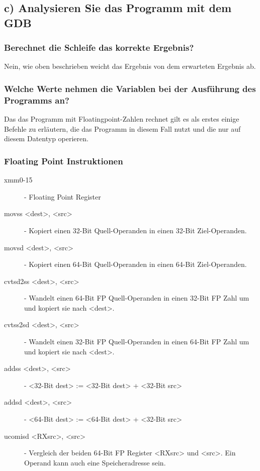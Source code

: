 \documentclass[12pt]{article}
\begin{document}
\subsection{c) Analysieren Sie das Programm mit dem GDB }

\subsubsection{Berechnet die Schleife das korrekte Ergebnis?}
Nein, wie oben beschrieben weicht das Ergebnis von dem erwarteten Ergebnis ab.

\subsubsection{Welche Werte nehmen die Variablen bei der Ausführung des Programms an?}
Das das Programm mit Floatingpoint-Zahlen rechnet gilt es als erstes einige Befehle zu erläutern, die das Programm in diesem Fall nutzt und die nur auf diesem Datentyp operieren.

\subsubsection*{Floating Point Instruktionen}
\begin{description}
	\item [xmm0-15] - Floating Point Register

	\item [movss <dest>, <src>] - Kopiert einen 32-Bit Quell-Operanden in einen 32-Bit Ziel-Operanden.

	\item [movsd <dest>, <src>] - Kopiert einen 64-Bit Quell-Operanden in einen 64-Bit Ziel-Operanden.

	\item [cvtsd2ss <dest>, <src>] - Wandelt einen 64-Bit FP Quell-Operanden in einen 32-Bit FP Zahl um und kopiert sie nach <dest>.

	\item [cvtss2sd <dest>, <src>] - Wandelt einen 32-Bit FP Quell-Operanden in einen 64-Bit FP Zahl um und kopiert sie nach <dest>.

	\item [addss <dest>, <src>] - <32-Bit dest> := <32-Bit dest> + <32-Bit src>

	\item [addsd <dest>, <src>] - <64-Bit dest> := <64-Bit dest> + <32-Bit src>

	\item [ucomisd <RXsrc>, <src>] - Vergleich der beiden 64-Bit FP Register <RXsrc> und <src>. Ein Operand kann auch eine Speicheradresse sein.
\end{description}
\end{document}
